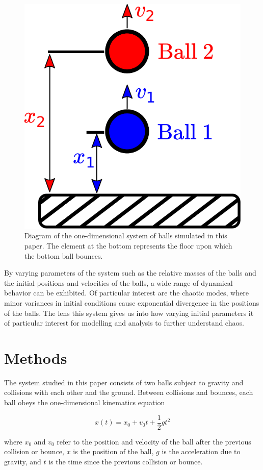 \documentclass[pra,twocolumn,showpacs,amsmath,amssymb, aps, 10pt]{revtex4-1}
\begin{document}
\begin{figure}[h]
  \includegraphics[width=.7\linewidth]{balls}
  \caption{Diagram of the one-dimensional system of balls simulated in this
  paper. The element at the bottom represents the floor upon which the bottom
  ball bounces.}
  \label{fig:balls}
\end{figure}

By varying parameters of the system such as the relative masses of the balls and
the initial positions and velocities of the balls, a wide range of dynamical
behavior can be exhibited. Of particular interest are the chaotic modes, where
minor variances in initial conditions cause exponential divergence in the positions
of the balls. The lens this system gives us into how varying initial
parameters it of particular interest for modelling and analysis to further
understand chaos.



\section{Methods} \label{sec:methods}

The system studied in this paper consists of two balls subject to gravity and
collisions with each other and the ground. Between collisions and bounces, each
ball obeys the one-dimensional kinematics equation

\begin{equation}
  x(t) = x_0 + v_0 t + \frac{1}{2} g t^2
  \label{eq:kinematics}
\end{equation}

where $x_0$ and $v_0$ refer to the position and velocity
of the ball after the previous collision or bounce, $x$ is the position of the ball,
$g$ is the acceleration due to gravity, and $t$ is the time since the previous
collision or bounce. %
\end{document}
